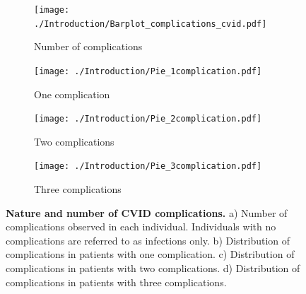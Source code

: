\begin{figure}[H]
\centering
\begin{subfigure}[b]{0.49\textwidth}
	\centering
	\texttt{[image: ./Introduction/Barplot\_complications\_cvid.pdf]}%
	\caption{Number of complications}%
\end{subfigure}
\begin{subfigure}[b]{0.49\textwidth}
	\centering
	\texttt{[image: ./Introduction/Pie\_1complication.pdf]}%
	\caption{One complication}%
\end{subfigure}
\begin{subfigure}[b]{0.49\textwidth}
	\centering
	\texttt{[image: ./Introduction/Pie\_2complication.pdf]}%
	\caption{Two complications}%
\end{subfigure}
\begin{subfigure}[b]{0.49\textwidth}
	\centering
	\texttt{[image: ./Introduction/Pie\_3complication.pdf]}%
	\caption{Three complications}%
\end{subfigure}
\caption[Nature and number of CVID complications]{\textbf{Nature and number of CVID complications.} a) Number of complications observed in each individual. Individuals with no complications are referred to as infections only. b) Distribution of complications in patients with one complication. c)  Distribution of complications in patients with two complications. d)  Distribution of complications in patients with three complications. \parencite{Chapel2008}}
\label{fig:complications.intro.cvid}
\end{figure}


